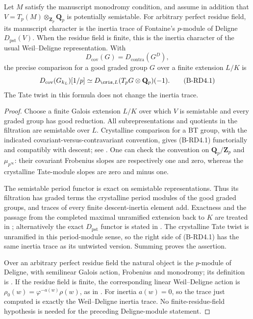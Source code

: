 \begin{proposition}
\label{prop:B-RD4-dictionary}
Let $M$ satisfy the manuscript monodromy condition, and assume in
addition that $V=T_p(M)\otimes_{\mathbf Z_p}\mathbf Q_p$ is potentially
semistable. For arbitrary perfect residue field, its manuscript
character is the inertia trace of Fontaine's $p$-module of Deligne
$D_{\mathrm{pst}}(V)$. When the residue field is finite, this is the
inertia character of the usual Weil--Deligne representation. With
\[
 D_{\mathrm{cov}}(G)=D_{\mathrm{contra}}(G^D),
\]
the precise comparison for a good graded group $G$ over a finite
extension $L/K$ is
\[
 D_{\mathrm{cov}}(G_{k_L})[1/p]
       \simeq D_{\cris,L}(T_pG\otimes\mathbf Q_p)(-1).
                                                        \tag{B-RD4.1}
\]
The Tate twist in this formula does not change the inertia trace.
\end{proposition}
\begin{proof}
Choose a finite Galois extension $L/K$ over which $V$ is semistable
and every graded group has good reduction. All subrepresentations
and quotients in the filtration are semistable over $L$.
Crystalline comparison for a BT group, with the indicated
covariant-versus-contravariant convention, gives (B-RD4.1)
functorially and compatibly with descent; see
\cite[Lemma~2.2.4 and Corollary~2.2.6, author pp.26--27; Appendix~A.2
and~A.6]{Kisin2006Crystalline}. One can check the convention on
$\mathbf Q_p/\mathbf Z_p$ and $\mu_{p^\infty}$: their covariant
Frobenius slopes are respectively one and zero, whereas the
crystalline Tate-module slopes are zero and minus one.

The semistable period functor is exact on semistable
representations. Thus its filtration has graded terms the
crystalline period modules of the good graded groups, and traces
of every finite descent-inertia element add. Exactness and the
passage from the completed maximal unramified extension back to
$K$ are treated in \cite[\S\S5.1.5--5.1.7,
pp.156--158]{Fontaine1994Semi}; alternatively the exact
$D_{\mathrm{pst}}$ functor is stated in
\cite[\S2.3.4, p.337]{Fontaine1994WD}.
The crystalline Tate twist is unramified in this period-module
sense, so the right side of (B-RD4.1) has the same inertia trace as
its untwisted version. Summing proves the assertion.

Over an arbitrary perfect residue field the natural object is the
$p$-module of Deligne, with semilinear Galois action, Frobenius and
monodromy; its definition is
\cite[\S\S1.1.1--1.1.2, pp.322--323]{Fontaine1994WD}.
If the residue field is finite, the corresponding linear
Weil--Deligne action is
$\rho_0(w)=\varphi^{-a(w)}\rho(w)$, as in
\cite[\S1.3.5, p.329; \S2.3.7, pp.339--340]{Fontaine1994WD}.
For inertia $a(w)=0$, so the trace just computed is exactly the
Weil--Deligne inertia trace. No finite-residue-field hypothesis is
needed for the preceding Deligne-module statement.
\end{proof}

